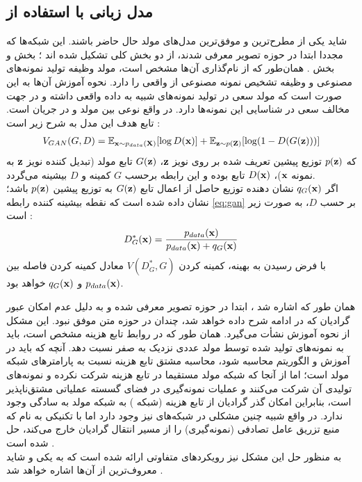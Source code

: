 \subsection{مدل زبانی با استفاده از \gan{}}
شاید 
 یکی از مطرح‌ترین و موفق‌ترین مدل‌های مولد حال حاضر باشند. این شبکه‌ها که مجددا ابتدا در حوزه تصویر معرفی شدند، از دو بخش کلی تشکیل شده اند \cite{gan}؛ بخش 
  و بخش 
.
  همان‌طور که از نام‌گذاری آن‌ها مشخص است، مولد وظیفه تولید نمونه‌های مصنوعی و \discriminator{} وظیفه تشخیص نمونه مصنوعی از واقعی را دارد. نحوه آموزش آن‌ها به این صورت است که مولد سعی در تولید نمونه‌های شبیه به داده واقعی داشته و \discriminator{} در جهت مخالف سعی در شناسایی این نمونه‌ها دارد. در واقع نوعی 
بین مولد و \discriminator{} در جریان است. تابع هدف این مدل به شرح زیر است \cite{gan}:
\begin{equation} \label{eq:gan}
	\begin{split}
		V_{GAN} (G, D) = \expected_{\bff{x} \sim p_{data}(\bff{X})} [\log D(\bff{x})] + \expected_{\bff{z} \sim p(\bff{Z})} [\log (1 - D(G(\bff{z})))]
	\end{split}
\end{equation}
که  $p({\bf z})$ توزیع پیشین تعریف شده بر روی نویز ${\bf z}$،
$G({\bf z})$
تابع مولد (تبدیل کننده نویز ${\bf z}$ به نمونه ${\bf x}$)، $D({\bf x})$ تابع \discriminator{} بوده و این رابطه برحسب $G$ کمینه و $D$ بیشینه می‌گردد.\\
اگر $q_G({\bf x})$ نشان دهنده توزیع حاصل از اعمال تابع $G({\bf z})$ به توزیع پیشین $p({\bf z})$ باشد؛ نشان داده شده است که نقطه بیشینه کننده رابطه \ref{eq:gan} بر حسب $D$، به صورت زیر است \cite{gan}:
\begin{gather}
	D_G^*({\bf x}) = \frac{p_{data}({\bf x})}{p_{data}({\bf x}) + q_G({\bf x})}
\end{gather}
با فرض رسیدن به \discriminator{} بهینه، کمینه کردن $V(D^*_G,G)$ معادل کمینه کردن فاصله  بین $p_{data}({\bf x})$ و $q_G({\bf x})$ خواهد بود.

همان طور که اشاره شد \gan{}، ابتدا در حوزه تصویر معرفی شده و به دلیل عدم امکان عبور گرادیان که در ادامه شرح داده خواهد شد، چندان در حوزه متن موفق نبود. این مشکل از نحوه آموزش نشأت می‌گیرد. همان طور که در روابط تابع هزینه مشخص است، \discriminator{} باید به نمونه‌های تولید شده توسط مولد عددی نزدیک به صفر نسبت دهد. آنچه که باید در آموزش و الگوریتم 
محاسبه شود، محاسبه مشتق تابع هزینه نسبت به پارامتر‌های شبکه مولد است؛ اما از آنجا که شبکه مولد مستقیما در تابع هزینه شرکت نکرده و نمونه‌های تولیدی آن شرکت می‌کنند و عملیات نمونه‌گیری در فضای گسسته عملیاتی مشتق‌ناپذیر است، بنابراین امکان گذر گرادیان از تابع هزینه (شبکه \discriminator{}) به شبکه مولد به سادگی وجود ندارد. در واقع شبیه چنین مشکلی در شبکه‌های \vae{} نیز وجود دارد اما با تکنیکی به نام
که منبع تزریق عامل تصادفی (نمونه‌گیری) را از مسیر انتقال گرادیان خارج می‌کند، حل شده است \cite{vae}.\\
به منظور حل این مشکل نیز رویکرد‌های متفاوتی ارائه شده است که به یکی و شاید معروف‌ترین از آن‌ها اشاره خواهد شد \cite{seqgan, gumbel}.\\
